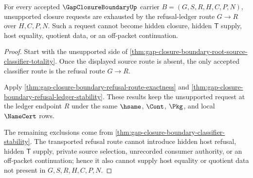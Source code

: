\begin{theorem}
\label{thm:gap-closure-boundary-refusal-ledger-route-totality}
For every accepted $\GapClosureBoundaryUp$ carrier $B=(G,S,R,H,C,P,N)$, unsupported closure requests are exhausted by the refusal-ledger route $G \longrightarrow R$ over $H,C,P,N$. Such a request cannot become hidden closure, hidden $\mathsf{T}$ supply, host equality, quotient data, or an off-packet continuation.
\end{theorem}
\begin{proof}
Start with the unsupported side of \autoref{thm:gap-closure-boundary-root-source-classifier-totality}. Once the displayed source route is absent, the only accepted classifier route is the refusal route $G \longrightarrow R$.

Apply \autoref{thm:gap-closure-boundary-refusal-route-exactness} and \autoref{thm:gap-closure-boundary-refusal-ledger-stability}. These results keep the unsupported request at the ledger endpoint $R$ under the same $\hsame$, $\Cont$, $\Pkg$, and local $\NameCert$ rows.

The remaining exclusions come from \autoref{thm:gap-closure-boundary-classifier-stability}. The transported refusal route cannot introduce hidden host refusal, hidden $\mathsf{T}$ supply, private source selection, unrecorded consumer authority, or an off-packet continuation; hence it also cannot supply host equality or quotient data not present in $G,S,R,H,C,P,N$.
\end{proof}

